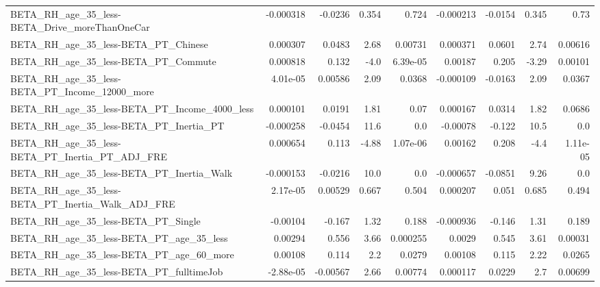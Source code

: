 \begin{tabular}{lrrrrrrrr}
BETA\_RH\_age\_35\_less-BETA\_Drive\_moreThanOneCar      &   -0.000318 &      -0.0236 &    0.354 &    0.724 &  -0.000213 &     -0.0154 &        0.345 &          0.73 \\
BETA\_RH\_age\_35\_less-BETA\_PT\_Chinese                &    0.000307 &       0.0483 &     2.68 &  0.00731 &   0.000371 &      0.0601 &         2.74 &       0.00616 \\
BETA\_RH\_age\_35\_less-BETA\_PT\_Commute                &    0.000818 &        0.132 &     -4.0 & 6.39e-05 &    0.00187 &       0.205 &        -3.29 &       0.00101 \\
BETA\_RH\_age\_35\_less-BETA\_PT\_Income\_12000\_more      &    4.01e-05 &      0.00586 &     2.09 &   0.0368 &  -0.000109 &     -0.0163 &         2.09 &        0.0367 \\
BETA\_RH\_age\_35\_less-BETA\_PT\_Income\_4000\_less       &    0.000101 &       0.0191 &     1.81 &     0.07 &   0.000167 &      0.0314 &         1.82 &        0.0686 \\
BETA\_RH\_age\_35\_less-BETA\_PT\_Inertia\_PT             &   -0.000258 &      -0.0454 &     11.6 &      0.0 &   -0.00078 &      -0.122 &         10.5 &           0.0 \\
BETA\_RH\_age\_35\_less-BETA\_PT\_Inertia\_PT\_ADJ\_FRE     &    0.000654 &        0.113 &    -4.88 & 1.07e-06 &    0.00162 &       0.208 &         -4.4 &      1.11e-05 \\
BETA\_RH\_age\_35\_less-BETA\_PT\_Inertia\_Walk           &   -0.000153 &      -0.0216 &     10.0 &      0.0 &  -0.000657 &     -0.0851 &         9.26 &           0.0 \\
BETA\_RH\_age\_35\_less-BETA\_PT\_Inertia\_Walk\_ADJ\_FRE   &    2.17e-05 &      0.00529 &    0.667 &    0.504 &   0.000207 &       0.051 &        0.685 &         0.494 \\
BETA\_RH\_age\_35\_less-BETA\_PT\_Single                 &    -0.00104 &       -0.167 &     1.32 &    0.188 &  -0.000936 &      -0.146 &         1.31 &         0.189 \\
BETA\_RH\_age\_35\_less-BETA\_PT\_age\_35\_less            &     0.00294 &        0.556 &     3.66 & 0.000255 &     0.0029 &       0.545 &         3.61 &       0.00031 \\
BETA\_RH\_age\_35\_less-BETA\_PT\_age\_60\_more            &     0.00108 &        0.114 &      2.2 &   0.0279 &    0.00108 &       0.115 &         2.22 &        0.0265 \\
BETA\_RH\_age\_35\_less-BETA\_PT\_fulltimeJob            &   -2.88e-05 &     -0.00567 &     2.66 &  0.00774 &   0.000117 &      0.0229 &          2.7 &       0.00699 \\

\end{tabular}
